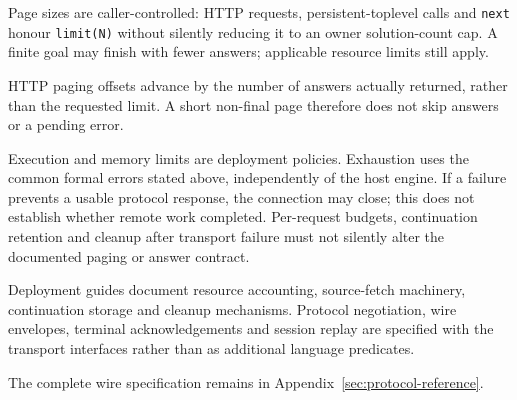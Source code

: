 Page sizes are caller-controlled: HTTP requests, persistent-toplevel calls and
\texttt{next} honour \texttt{limit(N)} without silently reducing it to an owner solution-count cap.
A finite goal may finish with fewer answers; applicable resource limits still apply.

HTTP paging offsets advance by the number of answers actually returned, rather than the requested
limit. A short non-final page therefore does not skip answers or a pending error.

Execution and memory limits are deployment policies. Exhaustion uses the
common formal errors stated above, independently of the host engine. If a
failure prevents a usable protocol response, the connection may close; this
does not establish whether remote work completed. Per-request budgets,
continuation retention and cleanup after transport failure must not silently
alter the documented paging or answer contract.

Deployment guides document resource accounting, source-fetch machinery,
continuation storage and cleanup mechanisms. Protocol negotiation, wire
envelopes, terminal acknowledgements and session replay are specified with
the transport interfaces rather than as additional language predicates.

The complete wire specification remains in Appendix~\ref{sec:protocol-reference}.

\endgroup
